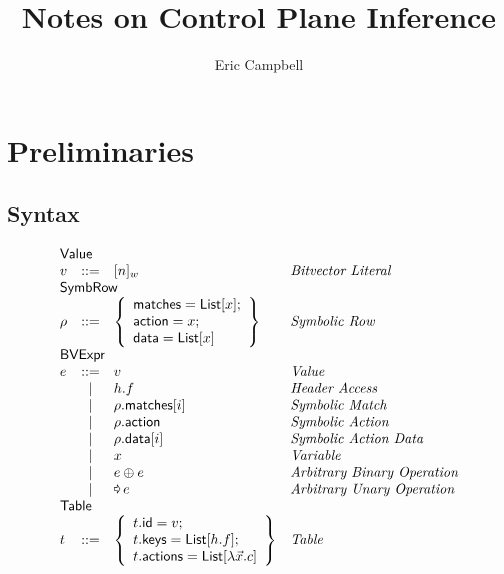 \documentclass{article}
\title{Notes on Control Plane Inference}
\author{Eric Campbell}
\newcommand{\binop}{\mathbin{\oplus}}
\newcommand{\unop}{\mathop{\text{\pointer}}}
\newcommand{\Value}{\mathsf{Value}}
\newcommand{\BVExpr}{\mathsf{BVExpr}}
\newcommand{\Table}{\mathsf{Table}}
\newcommand{\List}{\mathsf{List}}
\newcommand{\SymbRow}{\mathsf{SymbRow}}
\newcommand{\matches}{\mathsf{matches}}
\newcommand{\action}{\mathsf{action}}
\newcommand{\actions}{\mathsf{actions}}
\newcommand{\keys}{\mathsf{keys}}
\newcommand{\data}{\mathsf{data}}
\newcommand{\id}{\mathsf{id}}
\begin{document}
\maketitle

\section{Preliminaries}

\subsection{Syntax}

\begin{figure}[htp]
  \[\begin{array}{lcll}
    \multicolumn{3}{l}{\Value} \\
    v & ::= & [n]_w  & \textit{Bitvector Literal}\\
    \multicolumn{3}{l}{\SymbRow} \\
    \rho & ::= & \left\{
    \begin{array}{l}
      \matches = \List[x];\\
      \action = x;\\
      \data = \List[x]
    \end{array}\right\} & \textit{Symbolic Row}\\
    \multicolumn{3}{l}{\BVExpr} \\
    e & ::= & v & \textit{Value}\\
      & \mid & h.f & \textit{Header Access} \\
      & \mid & \rho.\matches[i] & \textit{Symbolic Match} \\
      & \mid & \rho.\action & \textit{Symbolic Action}\\
      & \mid & \rho.\data[i] & \textit{Symbolic Action Data}\\
      & \mid & x & \textit{Variable}\\
      & \mid & e \binop e & \textit{Arbitrary Binary Operation}\\
    & \mid & \unop e & \textit{Arbitrary Unary Operation}\\
    \multicolumn{3}{l}{\Table} \\
    t & ::= & \left\{\begin{array}{l}
    t.\id = v; \\
    t.\keys = \List[h.f]; \\
    t.\actions = \List[\lambda \vec x. c]\\
    \end{array}\right\} & \textit{Table}\\

\end{array}\]
\end{figure}
\end{document}
